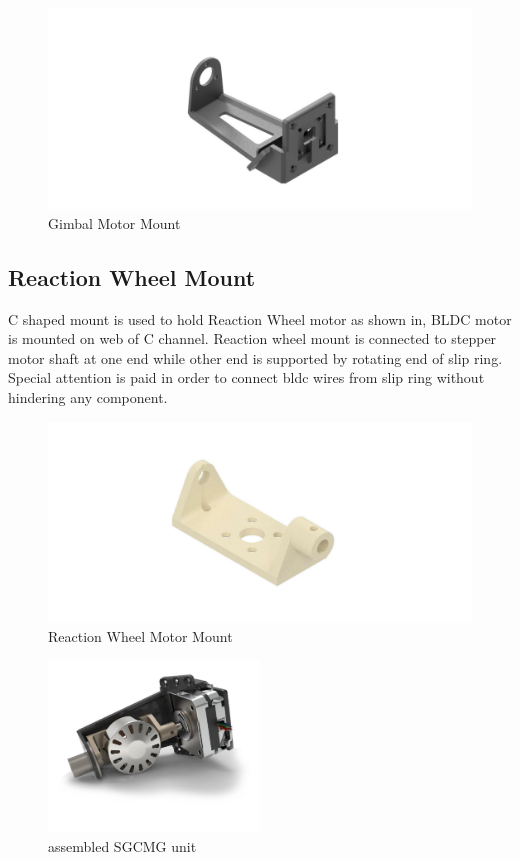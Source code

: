 \begin{figure}[ht]
    \centering
    \includegraphics[width=\textwidth]{figures/Assembly/STP_MOUNT.pdf}
    \caption{Gimbal Motor Mount }
    \label{fig:GMBL_MNT}
\end{figure}

\subsection{Reaction Wheel Mount}
C shaped mount is used to hold Reaction Wheel motor as shown in, BLDC motor is mounted on web of C channel. Reaction wheel mount is connected to stepper motor shaft at one end while other end is supported by rotating end of slip ring. Special attention is paid in order to connect \acrshort{bldc} wires from slip ring without hindering any component. 

\begin{figure}[ht]
    \centering
    \includegraphics[width=\textwidth]{figures/Assembly/rwMount.pdf}
    \caption{Reaction Wheel Motor Mount }
    \label{fig:RW_MNT}
\end{figure}

\begin{figure}[ht]
    \centering
    \includegraphics[width=0.5\textwidth]{figures/Assembly/sgcmg2.pdf}
    \caption{assembled SGCMG unit}
    \label{fig:SGCMG_ASM}
\end{figure}

